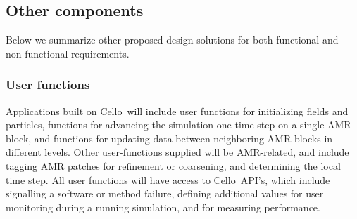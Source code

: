 \documentclass[11pt,letterpaper]{article}
\newcommand{\cello}{\textsf{Cello}}
\begin{document}

% 

\subsection{Other components} \label{ss:design-other}


Below we summarize other proposed design solutions for both functional
and non-functional requirements.

\subsubsection{User functions} \label{sss:design-user}


Applications built on \cello\ will include user functions for
initializing fields and particles, functions for advancing the
simulation one time step on a single AMR block, and functions for
updating data between neighboring AMR blocks in different levels.
Other user-functions supplied will be AMR-related, and include tagging
AMR patches for refinement or coarsening, and determining the local
time step.  All user functions will have access to \cello\ API's,
which include signalling a software or method failure, defining
additional values for user monitoring during a running simulation, and
for measuring performance.

\end{document}
